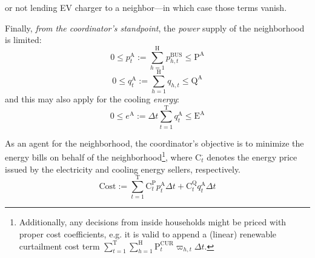 \documentclass[journal]{IEEEtran}
\begin{document}
or not lending EV charger to a neighbor---in which case those terms vanish.
\par
Finally, \textit{from the coordinator's standpoint}, the \textit{power} supply of
the neighborhood is limited:
\begin{equation}\label{pAlimit}
    0 \le p^\mathrm{A}_t := \sum_{h=1}^\mathrm{H} p_{h, t}^\mathrm{BUS} \le \mathrm{P}^\mathrm{A}
\end{equation}
\begin{equation}\label{qAlimit}
    0 \le q^\mathrm{A}_t := \sum_{h=1}^\mathrm{H} q_{h, t} \le \mathrm{Q}^\mathrm{A}
\end{equation}
and this may also apply for the cooling \textit{energy}:
\begin{equation}\label{eqlimit}
    0 \le e^\mathrm{A} := \Delta t \sum_{t=1}^\mathrm{T}  q^\mathrm{A}_t \le \mathrm{E}^\mathrm{A}
\end{equation}
\par
As an agent for the neighborhood, the coordinator's objective is to
minimize the energy bills on behalf of the neighborhood\footnote{Additionally, any decisions from inside households might be priced with
proper cost coefficients, e.g. it is valid to append a (linear) renewable curtailment cost term
\( \sum_{t=1}^\mathrm{T} \sum_{h=1}^\mathrm{H} \mathrm{P}_t^\mathrm{CUR} \varpi_{h, t} \Delta t \).},
where $\mathrm{C}_t^{\boldsymbol{\cdot}}$ denotes the energy price
issued by the electricity and cooling energy sellers, respectively.
\begin{equation}\label{eq:cost}
    \text{Cost} := \sum_{t=1}^\mathrm{T}  \mathrm{C}_t^\mathrm{P} p^\mathrm{A}_t \Delta t + \mathrm{C}_t^\mathrm{Q} q^\mathrm{A}_t \Delta t
\end{equation}
\end{document}
